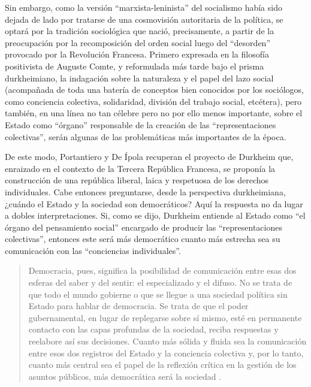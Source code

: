 Sin embargo, como la versión \enquote{marxista-leninista} del socialismo había sido dejada de lado por tratarse de una cosmovisión autoritaria de la política, se optará por la tradición sociológica que nació, precisamente, a partir de la preocupación por la recomposición del orden social luego del \enquote{desorden} provocado por la Revolución Francesa. Primero expresada en la filosofía positivista de Auguste Comte, y reformulada más tarde bajo el prisma durkheimiano, la indagación sobre la naturaleza y el papel del lazo social (acompañada de toda una batería de conceptos bien conocidos por los sociólogos, como conciencia colectiva, solidaridad, división del trabajo social, etcétera), pero también, en una línea no tan célebre pero no por ello menos importante, sobre el Estado como \enquote{órgano} responsable de la creación de las \enquote{representaciones colectivas}, serán algunas de las problemáticas más importantes de la época.

De este modo, Portantiero y De Ípola recuperan el proyecto de Durkheim que, enraizado en el contexto de la Tercera República Francesa, se proponía la construcción de una república liberal, laica y respetuosa de los derechos individuales. Cabe entonces preguntarse, desde la perspectiva durkheimiana, ¿cuándo el Estado y la sociedad son democráticos? Aquí la respuesta no da lugar a dobles interpretaciones. Si, como se dijo, Durkheim entiende al Estado como \enquote{el órgano del pensamiento social} encargado de producir las \enquote{representaciones colectivas}, entonces este será más democrático cuanto más estrecha sea su comunicación con las \enquote{conciencias individuales}.

\begin{quote}
Democracia, pues, significa la posibilidad de comunicación entre esas dos esferas del saber y del sentir: el especializado y el difuso. No se trata de que todo el mundo gobierne o que se llegue a una sociedad política sin Estado para hablar de democracia. Se trata de que el poder gubernamental, en lugar de replegarse sobre sí mismo, esté en permanente contacto con las capas profundas de la sociedad, reciba respuestas y reelabore así sus decisiones. Cuanto más sólida y fluida sea la comunicación entre esos dos registros del Estado y la conciencia colectiva y, por lo tanto, cuanto más central sea el papel de la reflexión crítica en la gestión de los asuntos públicos, más democrática será la sociedad \parencite[19]{1540-PORTANTIERO1987}.
\end{quote}

